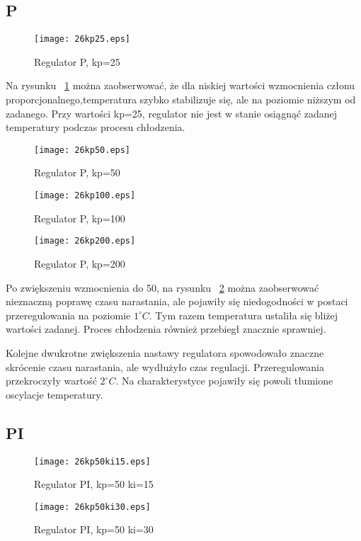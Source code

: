 \subsection{P}
\begin{figure}[H]
	\centering
	\texttt{[image: 26kp25.eps]}
	\caption{Regulator P, kp=25}
	\label{fig:kp25}
\end{figure}
Na rysunku ~\ref{fig:kp25} można zaobserwować, że dla niskiej wartości wzmocnienia członu proporcjonalnego,temperatura szybko stabilizuje się, ale na poziomie niższym od zadanego. Przy wartości kp=25, regulator nie jest w stanie osiągnąć zadanej temperatury podczas procesu chłodzenia.
\newpage
\begin{figure}[H]
	\centering
	\texttt{[image: 26kp50.eps]}
	\caption{Regulator P, kp=50}
	\label{fig:kp50}
\end{figure}
\begin{figure}[H]
	\centering
	\texttt{[image: 26kp100.eps]}
	\caption{Regulator P, kp=100}
\end{figure}
\begin{figure}[H]
	\centering
	\texttt{[image: 26kp200.eps]}
	\caption{Regulator P, kp=200}
	\label{fig:kp200}
\end{figure}
Po zwiększeniu wzmocnienia do 50, na rysunku ~\ref{fig:kp50} można zaobserwować nieznaczną poprawę czasu narastania, ale pojawiły się niedogodności w postaci przeregulowania na poziomie $1^{\circ} C$. Tym razem temperatura  ustaliła się bliżej wartości zadanej. Proces chłodzenia również przebiegł znacznie sprawniej.

Kolejne dwukrotne zwiększenia nastawy regulatora spowodowało znaczne skrócenie czasu narastania, ale wydłużyło czas regulacji. Przeregulowania przekroczyły wartość $2^{\circ} C$. Na charakterystyce pojawiły się powoli tłumione oscylacje temperatury.
\newpage

\subsection{PI}

\begin{figure}[H]
	\centering
	\texttt{[image: 26kp50ki15.eps]}
	\caption{Regulator PI, kp=50 ki=15}
	\label{fig:ki15}
\end{figure}
\begin{figure}[H]
	\centering
	\texttt{[image: 26kp50ki30.eps]}
	\caption{Regulator PI, kp=50 ki=30}
	\label{fig:ki30}
\end{figure}

